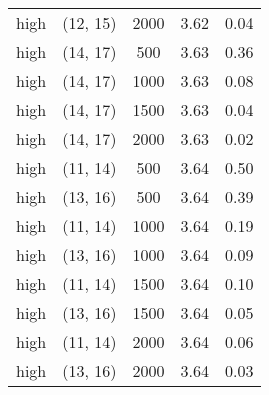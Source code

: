 \begin{tabular}{c c c c c}
high & (12, 15) &  2000 & 3.62 & 0.04 \\
high & (14, 17) &  500 & 3.63 & 0.36 \\
high & (14, 17) &  1000 & 3.63 & 0.08 \\
high & (14, 17) &  1500 & 3.63 & 0.04 \\
high & (14, 17) &  2000 & 3.63 & 0.02 \\
high & (11, 14) &  500 & 3.64 & 0.50 \\
high & (13, 16) &  500 & 3.64 & 0.39 \\
high & (11, 14) &  1000 & 3.64 & 0.19 \\
high & (13, 16) &  1000 & 3.64 & 0.09 \\
high & (11, 14) &  1500 & 3.64 & 0.10 \\
high & (13, 16) &  1500 & 3.64 & 0.05 \\
high & (11, 14) &  2000 & 3.64 & 0.06 \\
high & (13, 16) &  2000 & 3.64 & 0.03 \\
\hline
\end{tabular}
